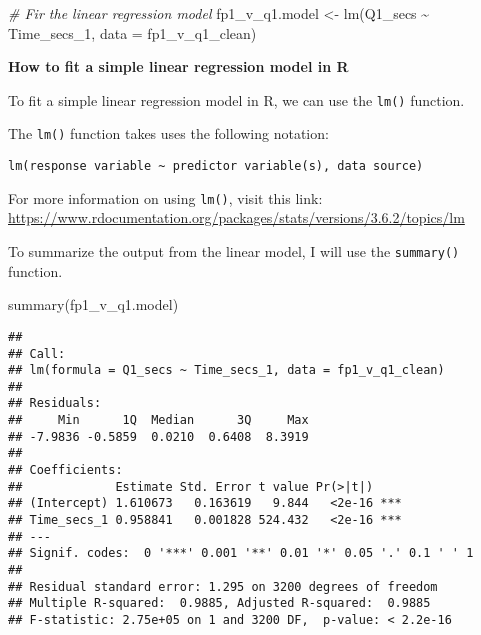 \documentclass[
]{book}
\newenvironment{Shaded}{\begin{snugshade}}{\end{snugshade}}
\newcommand{\AttributeTok}[1]{\textcolor[rgb]{0.77,0.63,0.00}{#1}}
\newcommand{\CommentTok}[1]{\textcolor[rgb]{0.56,0.35,0.01}{\textit{#1}}}
\newcommand{\FunctionTok}[1]{\textcolor[rgb]{0.00,0.00,0.00}{#1}}
\newcommand{\NormalTok}[1]{#1}
\newcommand{\OtherTok}[1]{\textcolor[rgb]{0.56,0.35,0.01}{#1}}
\newcommand{\SpecialCharTok}[1]{\textcolor[rgb]{0.00,0.00,0.00}{#1}}
\begin{document}
\begin{Shaded}
\begin{Highlighting}[]
\CommentTok{\# Fir the linear regression model}
\NormalTok{fp1\_v\_q1.model }\OtherTok{\textless{}{-}} \FunctionTok{lm}\NormalTok{(Q1\_secs }\SpecialCharTok{\textasciitilde{}}\NormalTok{ Time\_secs\_1, }\AttributeTok{data =}\NormalTok{ fp1\_v\_q1\_clean)}
\end{Highlighting}
\end{Shaded}

\begin{blackbox}

\begin{center}
\textbf{How to fit a simple linear regression model in R}

\end{center}

To fit a simple linear regression model in R, we can use the \texttt{lm()} function.

The \texttt{lm()} function takes uses the following notation:

\texttt{lm(response\ variable\ \textasciitilde{}\ predictor\ variable(s),\ data\ source)}

For more information on using \texttt{lm()}, visit this link: \url{https://www.rdocumentation.org/packages/stats/versions/3.6.2/topics/lm}

\end{blackbox}

To summarize the output from the linear model, I will use the \texttt{summary()} function.

\begin{Shaded}
\begin{Highlighting}[]
\FunctionTok{summary}\NormalTok{(fp1\_v\_q1.model)}
\end{Highlighting}
\end{Shaded}

\begin{verbatim}
## 
## Call:
## lm(formula = Q1_secs ~ Time_secs_1, data = fp1_v_q1_clean)
## 
## Residuals:
##     Min      1Q  Median      3Q     Max 
## -7.9836 -0.5859  0.0210  0.6408  8.3919 
## 
## Coefficients:
##             Estimate Std. Error t value Pr(>|t|)    
## (Intercept) 1.610673   0.163619   9.844   <2e-16 ***
## Time_secs_1 0.958841   0.001828 524.432   <2e-16 ***
## ---
## Signif. codes:  0 '***' 0.001 '**' 0.01 '*' 0.05 '.' 0.1 ' ' 1
## 
## Residual standard error: 1.295 on 3200 degrees of freedom
## Multiple R-squared:  0.9885, Adjusted R-squared:  0.9885 
## F-statistic: 2.75e+05 on 1 and 3200 DF,  p-value: < 2.2e-16
\end{verbatim}
\end{document}
